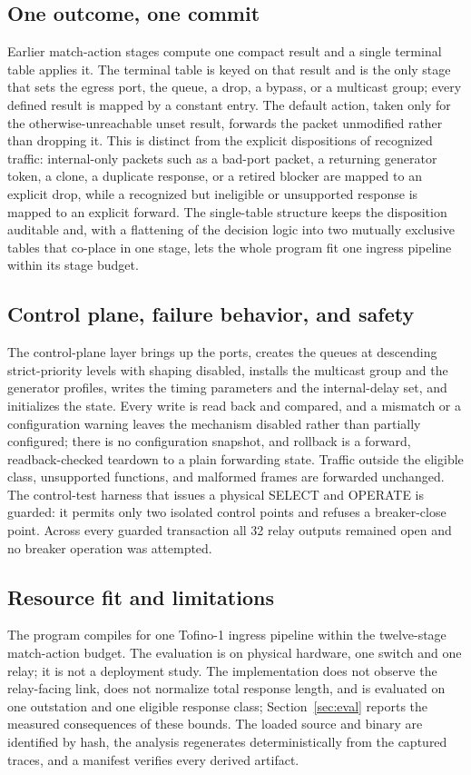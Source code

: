 \subsection{One outcome, one commit}
Earlier match-action stages compute one compact result and a single terminal table applies it. The
terminal table is keyed on that result and is the only stage that sets the egress port, the queue, a
drop, a bypass, or a multicast group; every defined result is mapped by a constant entry. The default
action, taken only for the otherwise-unreachable unset result, forwards the packet unmodified rather
than dropping it. This is distinct from the explicit dispositions of recognized traffic: internal-only
packets such as a bad-port packet, a returning generator token, a clone, a duplicate response, or a
retired blocker are mapped to an explicit drop, while a recognized but ineligible or unsupported
response is mapped to an explicit forward. The single-table structure keeps the disposition auditable
and, with a flattening of the decision logic into two mutually exclusive tables that co-place in one
stage, lets the whole program fit one ingress pipeline within its stage budget.

\subsection{Control plane, failure behavior, and safety}
The control-plane layer brings up the ports, creates the queues at descending strict-priority levels
with shaping disabled, installs the multicast group and the generator profiles, writes the timing
parameters and the internal-delay set, and initializes the state. Every write is read back and
compared, and a mismatch or a configuration warning leaves the mechanism disabled rather than
partially configured; there is no configuration snapshot, and rollback is a forward, readback-checked
teardown to a plain forwarding state. Traffic outside the eligible class, unsupported functions, and
malformed frames are forwarded unchanged. The control-test harness that issues a physical SELECT and
OPERATE is guarded: it permits only two isolated control points and refuses a breaker-close point.
Across every guarded transaction all 32 relay outputs remained open and no breaker operation was
attempted.

\subsection{Resource fit and limitations}
The program compiles for one Tofino-1 ingress pipeline within the twelve-stage match-action budget.
The evaluation is on physical hardware, one switch and one relay; it is not a deployment study. The
implementation does not observe the relay-facing link, does not normalize total response length, and
is evaluated on one outstation and one eligible response class; Section~\ref{sec:eval} reports the
measured consequences of these bounds. The loaded source and binary are identified by hash, the
analysis regenerates deterministically from the captured traces, and a manifest verifies every derived
artifact.
